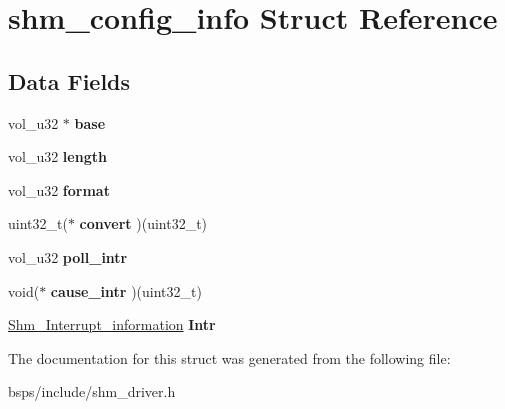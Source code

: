 \hypertarget{structshm__config__info}{}\section{shm\+\_\+config\+\_\+info Struct Reference}
\label{structshm__config__info}
\subsection*{Data Fields}
\begin{DoxyCompactItemize}
\item 
\mbox{\label{structshm__config__info_a61f96231c825f03cbf896d14491cec7a}} 
vol\+\_\+u32 $\ast$ {\bfseries base}
\item 
\mbox{\label{structshm__config__info_a68db03a06bd16d771889378b70c64dd5}} 
vol\+\_\+u32 {\bfseries length}
\item 
\mbox{\label{structshm__config__info_a45dda667f78109191ae8a4e9764febd6}} 
vol\+\_\+u32 {\bfseries format}
\item 
\mbox{\label{structshm__config__info_a5ef4946848d8b0ba92d241b1f7d1c121}} 
uint32\+\_\+t($\ast$ {\bfseries convert} )(uint32\+\_\+t)
\item 
\mbox{\label{structshm__config__info_aebead1883ad135a4ca0a71532e7d9935}} 
vol\+\_\+u32 {\bfseries poll\+\_\+intr}
\item 
\mbox{\label{structshm__config__info_a7378d17deda19d49d38c4be5acf78c22}} 
void($\ast$ {\bfseries cause\+\_\+intr} )(uint32\+\_\+t)
\item 
\mbox{\label{structshm__config__info_a81680c05dedc821d868899e7aa2f1561}} 
\mbox{\hyperlink{structShm__Interrupt__information}{Shm\+\_\+\+Interrupt\+\_\+information}} {\bfseries Intr}
\end{DoxyCompactItemize}


The documentation for this struct was generated from the following file\+:\begin{DoxyCompactItemize}
\item 
bsps/include/shm\+\_\+driver.\+h\end{DoxyCompactItemize}
